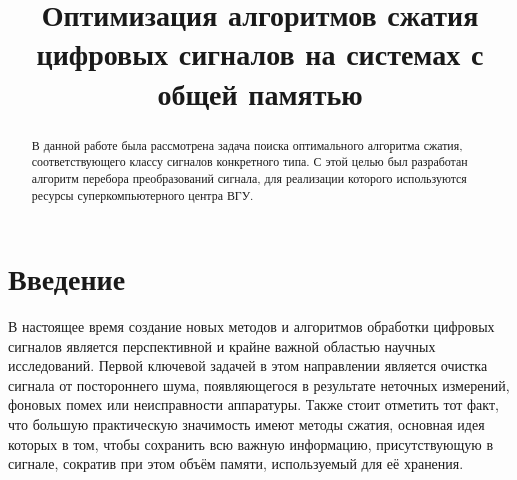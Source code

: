 \documentclass[11pt, oneside, a4paper]{article}
\begin{document}

\title{Оптимизация алгоритмов сжатия цифровых сигналов на системах с общей памятью}


\begin{abstract}
В данной работе была рассмотрена задача поиска оптимального алгоритма сжатия, соответствующего классу сигналов конкретного типа. С этой целью был разработан алгоритм перебора преобразований сигнала, для реализации которого используются ресурсы суперкомпьютерного центра ВГУ.
\end{abstract}



\section{Введение}

В настоящее время создание новых методов и алгоритмов обработки цифровых сигналов является перспективной и крайне важной областью научных исследований. Первой ключевой задачей в этом направлении является очистка сигнала от постороннего шума, появляющегося в результате неточных измерений, фоновых помех или неисправности аппаратуры. Также стоит отметить тот факт, что большую практическую значимость имеют методы сжатия, основная идея которых в том, чтобы сохранить всю важную информацию, присутствующую в сигнале, сократив при этом объём памяти, используемый для её хранения.
\end{document}
